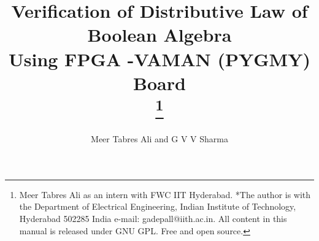 \documentclass[journal,10pt,twocolumn]{article}
\begin{document}
\newtheorem{theorem}{Theorem}[section]
\newtheorem{problem}{Problem}
\newtheorem{proposition}{Proposition}[section]
\newtheorem{lemma}{Lemma}[section]
\newtheorem{corollary}[theorem]{Corollary}
\newtheorem{example}{Example}[section]
\newtheorem{definition}[problem]{Definition}
\newcommand{\BEQA}{\begin{eqnarray}}
\newcommand{\EEQA}{\end{eqnarray}}
\newcommand{\define}{\stackrel{\triangle}{=}}
\newcommand*\circled[1]{\tikz[baseline=(char.base)]{
    \node[shape=circle,draw,inner sep=2pt] (char) {#1};}}

%
\providecommand{\mbf}{\mathbf}
\providecommand{\pr}[1]{\ensuremath{\Pr\left(#1\right)}}
\providecommand{\re}[1]{\ensuremath{\text{Re}\left(#1\right)}}
\providecommand{\im}[1]{\ensuremath{\text{Im}\left(#1\right)}}
\providecommand{\qfunc}[1]{\ensuremath{Q\left(#1\right)}}
\providecommand{\sbrak}[1]{\ensuremath{{}\left[#1\right]}}
\providecommand{\lsbrak}[1]{\ensuremath{{}\left[#1\right.}}
\providecommand{\rsbrak}[1]{\ensuremath{{}\left.#1\right]}}
\providecommand{\brak}[1]{\ensuremath{\left(#1\right)}}
\providecommand{\lbrak}[1]{\ensuremath{\left(#1\right.}}
\providecommand{\rbrak}[1]{\ensuremath{\left.#1\right)}}
\providecommand{\cbrak}[1]{\ensuremath{\left\{#1\right\}}}
\providecommand{\lcbrak}[1]{\ensuremath{\left\{#1\right.}}
\providecommand{\rcbrak}[1]{\ensuremath{\left.#1\right\}}}
\newcommand{\sgn}{\mathop{\mathrm{sgn}}}
\providecommand{\system}{\overset{\mathcal{H}}{ \longleftrightarrow}}
\newcommand{\solution}{\noindent \textbf{Solution: }}
\newcommand{\cosec}{\,\text{cosec}\,}
\providecommand{\dec}[2]{\ensuremath{\overset{#1}{\underset{#2}{\gtrless}}}}
\newcommand{\myvec}[1]{\ensuremath{\begin{pmatrix}#1\end{pmatrix}}}
\newcommand{\mydet}[1]{\ensuremath{\begin{vmatrix}#1\end{vmatrix}}}
	\newcommand*{\permcomb}[4][0mu]{{{}^{#3}\mkern#1#2_{#4}}}
\newcommand*{\perm}[1][-3mu]{\permcomb[#1]{P}}
\newcommand*{\comb}[1][-1mu]{\permcomb[#1]{C}}
\let\vec\mathbf
\title{
{Verification of Distributive Law of Boolean Algebra \\
Using FPGA -VAMAN (PYGMY) Board}\\
\thanks {Meer Tabres Ali as an intern with FWC IIT Hyderabad. *The author is with the Department of Electrical Engineering, Indian Institute of Technology, Hyderabad 502285 India e-mail: gadepall@iith.ac.in. All content in this manual is released under GNU GPL. Free and open source.}
}
\author{Meer Tabres Ali and G V V Sharma}
\maketitle
\tableofcontents
\end{document}
